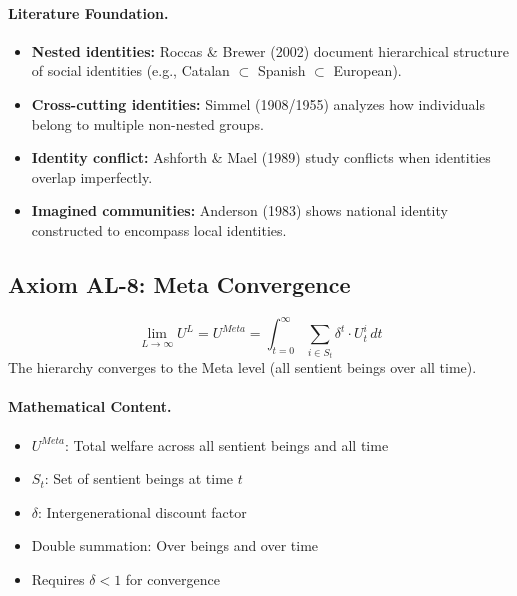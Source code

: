 \paragraph{Literature Foundation.}
\begin{itemize}
\item \textbf{Nested identities:} Roccas \& Brewer (2002) document hierarchical 
structure of social identities (e.g., Catalan $\subset$ Spanish $\subset$ European).
\item \textbf{Cross-cutting identities:} Simmel (1908/1955) analyzes how 
individuals belong to multiple non-nested groups.
\item \textbf{Identity conflict:} Ashforth \& Mael (1989) study conflicts when 
identities overlap imperfectly.
\item \textbf{Imagined communities:} Anderson (1983) shows national identity 
constructed to encompass local identities.
\end{itemize}

\subsection{Axiom AL-8: Meta Convergence}

\begin{tcolorbox}[colback=gray!5!white, colframe=gray!75!black, title=Axiom AL-8: Meta Convergence]
\begin{equation}
\boxed{
\lim_{L \to \infty} U^L = U^{Meta} = \int_{t=0}^{\infty} \sum_{i \in S_t} \delta^t \cdot U^i_t \, dt
}
\end{equation}
The hierarchy converges to the Meta level (all sentient beings over all time).
\end{tcolorbox}

\paragraph{Mathematical Content.}
\begin{itemize}
\item $U^{Meta}$: Total welfare across all sentient beings and all time
\item $S_t$: Set of sentient beings at time $t$
\item $\delta$: Intergenerational discount factor
\item Double summation: Over beings and over time
\item Requires $\delta < 1$ for convergence
\end{itemize}

